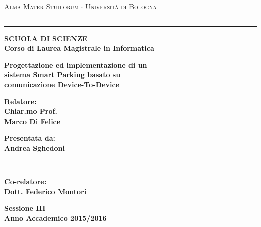 \documentclass[12pt,a4paper]{report}
\begin{document}
\begin{titlepage}
\begin{center}
{{\Large{\textsc{Alma Mater Studiorum $\cdot$ Universit\`a di
Bologna}}}} \rule[0.1cm]{15.8cm}{0.1mm}
\rule[0.5cm]{15.8cm}{0.6mm}
{\small{\bf SCUOLA DI SCIENZE\\
Corso di Laurea Magistrale in Informatica}}
\end{center}
\vspace{15mm}
\begin{center}
{\LARGE{\bf Progettazione ed implementazione di un}}\\
\vspace{3mm}
{\LARGE{\bf sistema Smart Parking basato su}}\\
\vspace{3mm}
{\LARGE{\bf comunicazione Device-To-Device}}\\
\end{center}
\vspace{40mm}
\par
\noindent
\begin{minipage}[t]{0.47\textwidth}
{\large{\bf Relatore:\\
Chiar.mo Prof.\\
Marco Di Felice}}
\end{minipage}
\hfill
\begin{minipage}[t]{0.47\textwidth}\raggedleft
{\large{\bf Presentata da:\\
Andrea Sghedoni}}
\end{minipage}
\vspace{10mm}
\\\begin{minipage}[t]{0.47\textwidth}
{\large{\bf Co-relatore:\\
Dott. Federico Montori}}
\end{minipage}
\vspace{13mm}
\begin{center}
{\large{\bf Sessione III\\
Anno Accademico 2015/2016}}
\end{center}
\end{titlepage}
\end{document}
